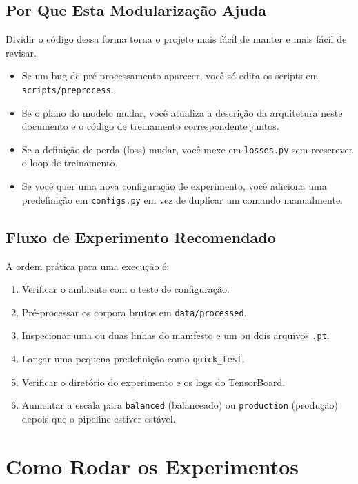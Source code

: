 \documentclass[11pt]{article}
\newcommand{\pathtt}[1]{\texttt{#1}}
\begin{document}
\subsection{Por Que Esta Modularização Ajuda}

Dividir o código dessa forma torna o projeto mais fácil de manter e mais fácil de revisar.

\begin{itemize}[leftmargin=1.5em]
  \item Se um bug de pré-processamento aparecer, você só edita os scripts em \pathtt{scripts/preprocess}.
  \item Se o plano do modelo mudar, você atualiza a descrição da arquitetura neste documento e o código de treinamento correspondente juntos.
  \item Se a definição de perda (loss) mudar, você mexe em \pathtt{losses.py} sem reescrever o loop de treinamento.
  \item Se você quer uma nova configuração de experimento, você adiciona uma predefinição em \pathtt{configs.py} em vez de duplicar um comando manualmente.
\end{itemize}

\subsection{Fluxo de Experimento Recomendado}

A ordem prática para uma execução é:

\begin{enumerate}[leftmargin=1.5em]
  \item Verificar o ambiente com o teste de configuração.
  \item Pré-processar os corpora brutos em \pathtt{data/processed}.
  \item Inspecionar uma ou duas linhas do manifesto e um ou dois arquivos \pathtt{.pt}.
  \item Lançar uma pequena predefinição como \pathtt{quick\_test}.
  \item Verificar o diretório do experimento e os logs do TensorBoard.
  \item Aumentar a escala para \pathtt{balanced} (balanceado) ou \pathtt{production} (produção) depois que o pipeline estiver estável.
\end{enumerate}

\section{Como Rodar os Experimentos}
\end{document}
